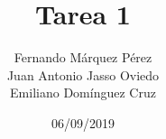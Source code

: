 \documentclass[12pt]{article}
\title{Tarea 1}
\author{Fernando Márquez Pérez \\ Juan Antonio Jasso Oviedo \\ Emiliano Dom\'inguez Cruz}
\date{06/09/2019}
\affil{Facultad de Ciencias\\UNAM}
\begin{document}
\begin{titlepage}
    \maketitle
\end{titlepage}
\end{document}
